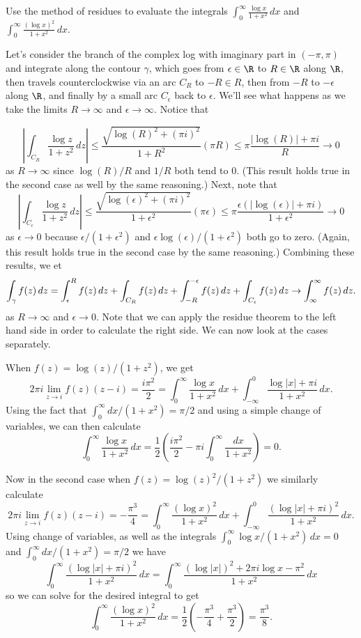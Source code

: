 \documentclass[11pt,letterpaper]{article}
\begin{document}
\begin{problem}
    Use the method of residues to evaluate the integrals $\displaystyle \int_0^\infty \frac{\log x}{1+x^2}\,dx$ and $\displaystyle \int_0^\infty \frac{(\log x)^2}{1+x^2}\,dx$.
\end{problem}

\begin{solution}
    Let's consider the branch of the complex log with imaginary part in $(-\pi, \pi)$ and integrate along the contour $\gamma$, which goes from $\epsilon\in \R$ to $R\in \R$ along $\R$, then travels counterclockwise via an arc $C_R$ to $-R\in R$, then from $-R$ to $-\epsilon$ along $\R$, and finally by a small arc $C_\epsilon$ back to $\epsilon$. We'll see what happens as 
    we take the limits $R\to \infty$ and $\epsilon\to \infty$. Notice that

    \[
        \left|\int_{C_R}\frac{\log z}{1+z^2}\,dz\right|\leq \frac{\sqrt{\log(R)^2+(\pi i)^2}}{1+R^2}(\pi R)\leq \pi\frac{|\log(R)|+\pi i}{R} \to 0
    \] 
    as $R\to \infty$ since $\log(R)/R$ and $1/R$ both tend to $0$. (This result holds true in the second case as well by the same reasoning.) Next, note that
    \[
        \left|\int_{C_\epsilon}\frac{\log z}{1+z^2}\,dz\right|\leq \frac{\sqrt{\log(\epsilon)^2+(\pi i)^2}}{1+\epsilon^2}(\pi \epsilon)\leq \pi\frac{\epsilon(|\log(\epsilon)|+\pi i)}{1+\epsilon^2}\to 0
    \] 
    as $\epsilon\to 0$ because $\epsilon/(1+\epsilon^2)$ and $\epsilon \log(\epsilon)/(1+\epsilon^2)$ both go to zero. (Again, this result holds true in the second case by the same reasoning.) Combining these results, we et
    \[
        \int_\gamma f(z)\,dz = \int^R_\epsilon f(z)\,dz + \int_{C_R}f(z)\,dz + \int^{-\epsilon}_{-R}f(z)\,dz+\int_{C_\epsilon}f(z)\,dz \to \int^{\infty}_{\-\infty}f(z)\,dz.
    \] 
    as $R\to \infty$ and $\epsilon \to 0$. Note that we can apply the residue theorem to the left hand side in order to calculate the right side. We can now look at the cases separately.

    When $f(z)=\log(z)/(1+z^2)$, we get
    \[
        2\pi i\lim_{z\to i}f(z)(z-i)=\frac{i\pi^2}{2}=\int^\infty_0 \frac{\log x}{1+x^2}\,dx+\int^0_{-\infty} \frac{\log |x|+\pi i}{1+x^2}\,dx.
    \] 
    Using the fact that $\int^\infty_0 dx/(1+x^2)=\pi/2$ and using a simple change of variables, we can then calculate
    \[
        \int^\infty_0 \frac{\log x}{1+x^2}\,dx=\frac{1}{2}\left(\frac{i\pi^2}{2}-\pi i \int^\infty_0 \frac{dx}{1+x^2}\right) = 0.
    \] 

    Now in the second case when $f(z)=\log(z)^2/(1+z^2)$ we similarly calculate
    \[
        2\pi i\lim_{z\to i}f(z)(z-i) = -\frac{\pi^3}{4}=\int^\infty_0\frac{(\log x)^2}{1+x^2}\,dx+\int^0_{-\infty}\frac{(\log |x|+\pi i)^2}{1+x^2}\,dx.
    \] 
    Using change of variables, as well as the integrals $\int^\infty_0 \log x/(1+x^2)\,dx=0$ and $\int^\infty_0 dx/(1+x^2)=\pi /2$ we have
    \[
        \int^\infty_0 \frac{(\log |x|+\pi i)^2}{1+x^2}\,dx=\int^\infty_0 \frac{(\log |x|)^2+2\pi i \log x-\pi^2}{1+x^2}\,dx
    \] 
    so we can solve for the desired integral to get
    \[
        \int^\infty_0 \frac{(\log x)^2}{1+x^2}\,dx = \frac{1}{2}\left(-\frac{\pi^3}{4}+\frac{\pi^3}{2}\right) = \frac{\pi^3}{8}.
    \] 
\end{solution}
\end{document}
